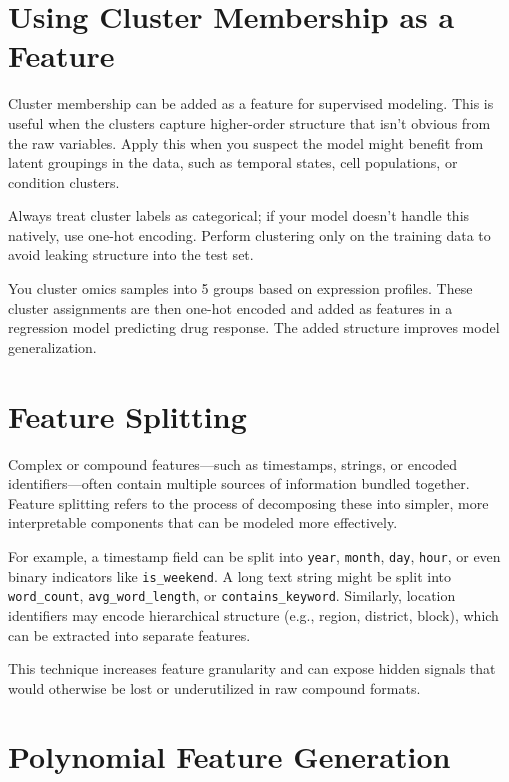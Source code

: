 \documentclass[12pt,openany]{book}
\begin{document}
\section{Using Cluster Membership as a Feature}

Cluster membership can be added as a feature for supervised modeling. This is useful when the clusters capture higher-order structure that isn't obvious from the raw variables. Apply this when you suspect the model might benefit from latent groupings in the data, such as temporal states, cell populations, or condition clusters.

Always treat cluster labels as categorical; if your model doesn’t handle this natively, use one-hot encoding. Perform clustering only on the training data to avoid leaking structure into the test set.

\begin{examplebox}
You cluster omics samples into 5 groups based on expression profiles. These cluster assignments are then one-hot encoded and added as features in a regression model predicting drug response. The added structure improves model generalization.
\end{examplebox}



\section{Feature Splitting}

Complex or compound features—such as timestamps, strings, or encoded identifiers—often contain multiple sources of information bundled together. Feature splitting refers to the process of decomposing these into simpler, more interpretable components that can be modeled more effectively.

For example, a timestamp field can be split into \texttt{year}, \texttt{month}, \texttt{day}, \texttt{hour}, or even binary indicators like \texttt{is\_weekend}. A long text string might be split into \texttt{word\_count}, \texttt{avg\_word\_length}, or \texttt{contains\_keyword}. Similarly, location identifiers may encode hierarchical structure (e.g., region, district, block), which can be extracted into separate features.

This technique increases feature granularity and can expose hidden signals that would otherwise be lost or underutilized in raw compound formats.



\section{Polynomial Feature Generation}
\end{document}
